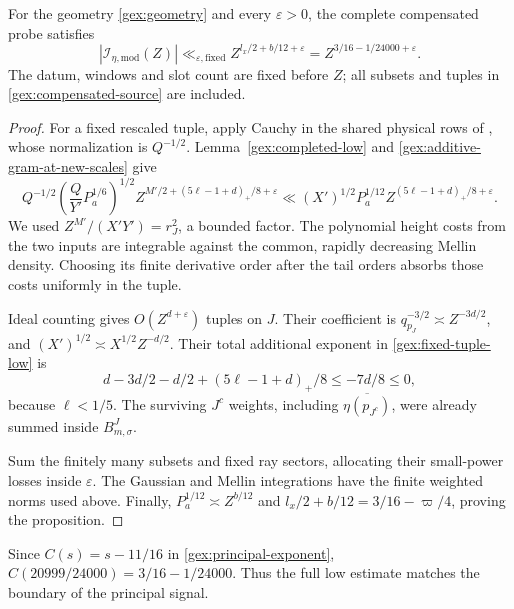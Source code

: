 \begin{proposition}
\label{gex:physical-low}
For the geometry \eqref{gex:geometry} and every \(\varepsilon>0\),
the complete compensated probe satisfies
\begin{equation}
 |\mathcal I_{\eta,\mathrm{mod}}(Z)|
 \ll_{\varepsilon,\mathrm{fixed}}
 Z^{l_x/2+b/12+\varepsilon}
 =Z^{3/16-1/24000+\varepsilon}.
\label{gex:physical-low-bound}
\end{equation}
The datum, windows and slot count are fixed before \(Z\);
all subsets and tuples in \eqref{gex:compensated-source} are included.
\end{proposition}

\begin{proof}
For a fixed rescaled tuple, apply Cauchy in the shared physical rows
of \cite[(6.2)]{OAI26}, whose normalization is \(Q^{-1/2}\).
Lemma~\ref{gex:completed-low} and
\eqref{gex:additive-gram-at-new-scales} give
\begin{equation}
 Q^{-1/2}
 \left(\frac Q{Y'}P_a^{1/6}\right)^{1/2}
 Z^{M'/2+(5\ell-1+d)_+/8+\varepsilon}
 \ll (X')^{1/2}P_a^{1/12}
       Z^{(5\ell-1+d)_+/8+\varepsilon}.
\label{gex:fixed-tuple-low}
\end{equation}
We used \(Z^{M'}/(X'Y')=r_J^2\), a bounded factor.
The polynomial height costs from the two inputs are integrable
against the common, rapidly decreasing Mellin density.  Choosing
its finite derivative order after the tail orders absorbs those
costs uniformly in the tuple.

Ideal counting gives \(O(Z^{d+\varepsilon})\) tuples on \(J\).
Their coefficient is \(q_{p_J}^{-3/2}\asymp Z^{-3d/2}\), and
\((X')^{1/2}\asymp X^{1/2}Z^{-d/2}\).  Their total additional
exponent in \eqref{gex:fixed-tuple-low} is
\begin{equation}
 d-3d/2-d/2+(5\ell-1+d)_+/8
 \le-7d/8\le0,
\label{gex:full-tuple-payment}
\end{equation}
because \(\ell<1/5\).  The surviving \(J^c\) weights, including
\(\overline{\eta(p_{J^c})}\), were already summed inside
\(B_{m,\sigma}^J\).

Sum the finitely many subsets and fixed ray sectors, allocating
their small-power losses inside \(\varepsilon\).
The Gaussian and Mellin integrations have the finite weighted
norms used above.  Finally,
\(P_a^{1/12}\asymp Z^{b/12}\) and
\(l_x/2+b/12=3/16-\varpi/4\), proving the proposition.
\end{proof}

Since \(C(s)=s-11/16\) in \eqref{gex:principal-exponent},
\(C(20999/24000)=3/16-1/24000\).
Thus the full low estimate matches the boundary of the principal signal.
